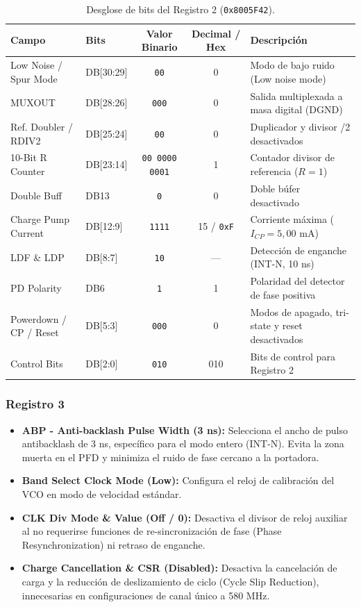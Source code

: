 \documentclass[11pt,a4paper,twoside]{report}
\begin{document}
	\begin{table}[htbp]
		\centering
		\begin{tabularx}{\textwidth}{l l c c X}
			\toprule
			\textbf{Campo} & \textbf{Bits} & \textbf{Valor Binario} & \textbf{Decimal / Hex} & \textbf{Descripción} \\
			\midrule
			Low Noise / Spur Mode & DB[30:29] & \texttt{00} & 0 & Modo de bajo ruido (Low noise mode) \\
			MUXOUT & DB[28:26] & \texttt{000} & 0 & Salida multiplexada a masa digital (DGND) \\
			Ref. Doubler / RDIV2 & DB[25:24] & \texttt{00} & 0 & Duplicador y divisor /2 desactivados \\
			10-Bit R Counter & DB[23:14] & \texttt{00 0000 0001} & 1 & Contador divisor de referencia ($R = 1$) \\
			Double Buff & DB13 & \texttt{0} & 0 & Doble búfer desactivado \\
			Charge Pump Current & DB[12:9] & \texttt{1111} & 15 / \texttt{0xF} & Corriente máxima ($I_{CP} = 5,00$ mA) \\
			LDF \& LDP & DB[8:7] & \texttt{10} & --- & Detección de enganche (INT-N, 10 ns) \\
			PD Polarity & DB6 & \texttt{1} & 1 & Polaridad del detector de fase positiva \\
			Powerdown / CP / Reset & DB[5:3] & \texttt{000} & 0 & Modos de apagado, tri-state y reset desactivados \\
			Control Bits & DB[2:0] & \texttt{010} & 010 & Bits de control para Registro 2 \\
			\bottomrule
		\end{tabularx}
		\caption{Desglose de bits del Registro 2 (\texttt{0x8005F42}).}
		\label{tab:adf4350_reg2}
	\end{table}\newpage
	
	
	\subsubsection{Registro 3}
	\begin{itemize}
		\item \textbf{ABP - Anti-backlash Pulse Width (3 ns):} Selecciona el ancho de pulso antibacklash de 3 ns, específico para el modo entero (INT-N). Evita la zona muerta en el PFD y minimiza el ruido de fase cercano a la portadora.
		
		\item \textbf{Band Select Clock Mode (Low):} Configura el reloj de calibración del VCO en modo de velocidad estándar.
		
		\item \textbf{CLK Div Mode \& Value (Off / 0):} Desactiva el divisor de reloj auxiliar al no requerirse funciones de re-sincronización de fase (Phase Resynchronization) ni retraso de enganche.
		
		\item \textbf{Charge Cancellation \& CSR (Disabled):} Desactiva la cancelación de carga y la reducción de deslizamiento de ciclo (Cycle Slip Reduction), innecesarias en configuraciones de canal único a 580 MHz.
	\end{itemize}
	
\end{document}
